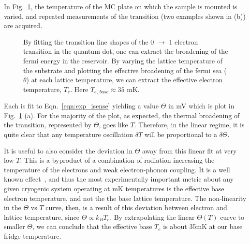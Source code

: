 In Fig.~\ref{fig:etemp}, the temperature of the \ac{MC} plate on which the sample is mounted is varied, and repeated measurements of the transition (two examples shown in (b)) are acquired. 
\begin{figure}[h]
\centering
{}
\caption{By fitting the transition line shapes of the 0 $\to$ 1 electron transition in the quantum dot, one can extract the broadening of the fermi energy in the reservoir. By varying the lattice temperature of the substrate and plotting the effective broadening of the fermi sea ($\theta$) at each lattice temperature, we can extract the effective electron temperature, $T_e$. Here $T_{e, \, base} \approx 35$ mK.}
\label{fig:etemp}       
\end{figure}
Each is fit to Eqn.~\ref{eqn:exp_isense} yielding a value $\Theta$ in mV which is plot in Fig.~\ref{fig:etemp} (a). For the majority of the plot, as expected, the thermal broadening of the transition, represented by $\Theta$, goes like $T$. Therefore, in the linear regime, it is quite clear that any temperature oscillation $\delta T$ will be proportional to a $\delta \Theta$. 

It is useful to also consider the deviation in $\Theta$ away from this linear fit at very low $T$. This is a byproduct of a combination of radiation increasing the temperature of the electrons and weak electron-phonon coupling. It is a well known effect~\cite{PhysRevB.49.5942}, and thus the most experimentally important metric about any given cryogenic system operating at mK temperatures is the effective base electron temperature, and not the the base lattice temperature. The non-linearity in the $\Theta$ vs $T$ curve, then, is a result of this deviation between electron and lattice temperature, since $\Theta \propto k_B T_e$. By extrapolating the linear $\Theta (T)$ curve to smaller $\Theta$, we can conclude that the effective base $T_e$ is about 35mK at our base fridge temperature.

